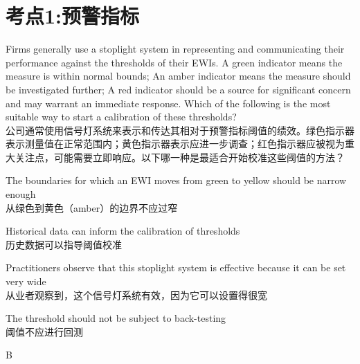 \documentclass{article}
\newcounter{question} %
\begin{document}
 \tableofcontents %
\newpage




\section{考点1:预警指标}
\setcounter{question}{0}

\begin{question}
    Firms generally use a stoplight system in representing and communicating their performance against the thresholds of their EWIs. A green indicator means the measure is within normal bounds; An amber indicator means the measure should be investigated further; A red indicator should be a source for significant concern and may warrant an immediate response. Which of the following is the most suitable way to start a calibration of these thresholds?\\
    公司通常使用信号灯系统来表示和传达其相对于预警指标阈值的绩效。绿色指示器表示测量值在正常范围内；黄色指示器表示应进一步调查；红色指示器应被视为重大关注点，可能需要立即响应。以下哪一种是最适合开始校准这些阈值的方法？
\end{question}

\begin{choices}
    \item The boundaries for which an EWI moves from green to yellow should be narrow enough\\
    从绿色到黄色（amber）的边界不应过窄
    \item Historical data can inform the calibration of thresholds\\
    历史数据可以指导阈值校准
    \item Practitioners observe that this stoplight system is effective because it can be set very wide\\
    从业者观察到，这个信号灯系统有效，因为它可以设置得很宽
    \item The threshold should not be subject to back-testing\\
    阈值不应进行回测
\end{choices}

\begin{correctanswer}
    B
\end{correctanswer}
\end{document}
